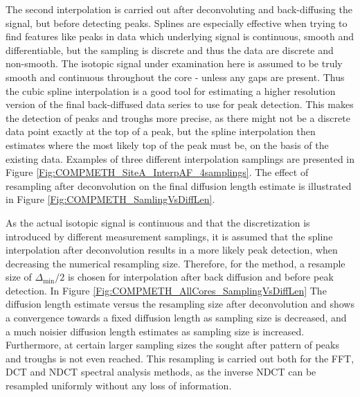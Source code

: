 \documentclass[../../CompleteThesis2/Complete_2ndDraft]{subfiles}
\begin{document}
The second interpolation is carried out after deconvoluting and back-diffusing the signal, but before detecting peaks. Splines are especially effective when trying to find features like peaks in data which underlying signal is continuous, smooth and differentiable, but the sampling is discrete and thus the data are discrete and non-smooth. The isotopic signal under examination here is assumed to be truly smooth and continuous throughout the core - unless any gaps are present. Thus the cubic spline interpolation is a good tool for estimating a higher resolution version of the final back-diffused data series to use for peak detection. This makes the detection of peaks and troughs more precise, as there might not be a discrete data point exactly at the top of a peak, but the spline interpolation then estimates where the most likely top of the peak must be, on the basis of the existing data. Examples of three different interpolation samplings are presented in Figure \ref{Fig:COMPMETH_SiteA_InterpAF_4samplings}. The effect of resampling after deconvolution on the final diffusion length estimate is illustrated in Figure \ref{Fig:COMPMETH_SamlingVsDiffLen}. 

As the actual isotopic signal is continuous and that the discretization is introduced by different measurement samplings, it is assumed that the spline interpolation after deconvolution results in a more likely peak detection, when decreasing the numerical resampling size. Therefore, for the method, a resample size of $\Delta_{\text{min}}/2$ is chosen for interpolation after back diffusion and before peak detection. In Figure \ref{Fig:COMPMETH_AllCores_SamplingVsDiffLen} The diffusion length estimate versus the resampling size after deconvolution and shows a convergence towards a fixed diffusion length as sampling size is decreased, and a much noisier diffusion length estimates as sampling size is increased. Furthermore, at certain larger sampling sizes the sought after pattern of peaks and troughs is not even reached. This resampling is carried out both for the FFT, DCT and NDCT spectral analysis methods, as the inverse NDCT can be resampled uniformly without any loss of information.
\end{document}

